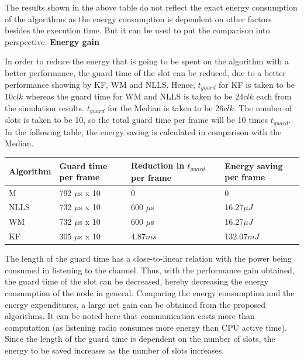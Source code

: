 \documentclass[journal]{IEEEtran}
\begin{document}
The results shown in the above table do not reflect the exact energy consumption of the algorithms as the energy consumption is dependent on other factors besides the execution time. But it can be used to put the comparison into perspective. \newline
\textbf{Energy gain}\par \noindent
In order to reduce the energy that is going to be spent on the algorithm with a better performance, the guard time of the slot can be reduced, due to a better performance showing by KF, WM and NLLS. 
Hence, $t_{guard}$ for KF is taken to be 10$clk$ whereas the guard time for WM and NLLS is taken to be $24clk$ each from the simulation results. $t_{guard}$ for the Median is taken to be 26$clk$. The number of slots is taken to be 10, so the total guard time per frame will be 10 times $t_{guard}$. In the following table, the energy saving is calculated in comparison with the Median. 
\begin{center}
    \begin{tabular}{ |p{1.5cm} | p{2cm} |p{2cm} | p{1.75cm} |  }
    \hline
    Algorithm & Guard time per frame & Reduction in $t_{guard}$ per frame & Energy saving per frame\\ \hline
    M &  792 $\mu$s x 10 & 0 & 0 \\ \hline
    NLLS & 732 $\mu$s x 10 & 600 $\mu$s & 16.27$\mu J$\\ \hline
    WM &   732 $\mu$s x 10 & 600 $\mu$s & 16.27$\mu J$ \\ \hline
    KF &  305 $\mu$s x 10 & 4.87$ms$ & 132.07$mJ$\\ \hline
    \end{tabular}
\end{center}
The length of the guard time has a close-to-linear relation with the power being consumed in listening to the channel. Thus, with the performance gain obtained, the guard time of the slot can be decreased, hereby decreasing the energy consumption of the node in general. Comparing the energy consumption and the energy expenditures, a large net gain can be obtained from the proposed algorithms. It can be noted here that communication costs more than computation (as listening radio consumes more energy than CPU active time). Since the length of the guard time is dependent on the number of slots, the energy to be saved increases as the number of slots increases.
\end{document}
